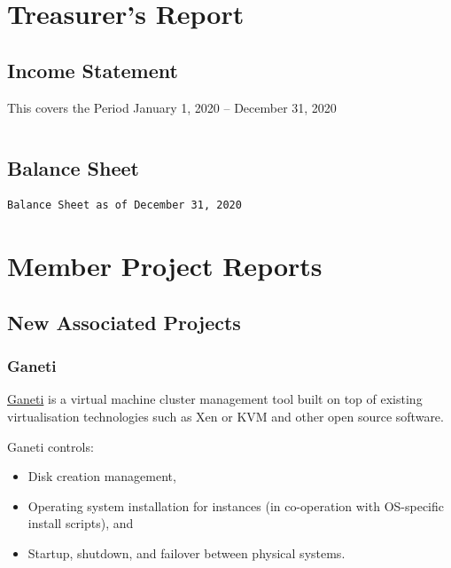 \documentclass[a4paper]{report}
\begin{document}
\chapter{Treasurer's Report}

\section{Income Statement}

This covers the Period January 1, 2020 -- December 31, 2020

\begin{verbatim}
\end{verbatim}

\section{Balance Sheet}

\begin{verbatim}
Balance Sheet as of December 31, 2020
\end{verbatim}

\chapter{Member Project Reports}

\section{New Associated Projects}

\subsection{Ganeti}

\href{https://www.ganeti.org/}{Ganeti} is a virtual machine cluster management tool built on top of existing virtualisation technologies such as Xen or KVM and other open source software.

Ganeti controls:

\begin{itemize}

\item Disk creation management,
\item Operating system installation for instances (in co-operation with OS-specific install scripts), and
\item Startup, shutdown, and failover between physical systems.

\end{itemize}
\end{document}
